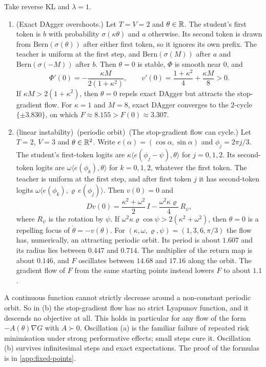 \begin{proposition}[Oscillations]\label{prop:oscillation}
Take reverse KL and $\lambda=1$.
\begin{enumerate}[label=(\alph*),nosep]
\item \Pv\Ck (Exact DAgger overshoots.) Let $T=V=2$ and $\theta\in\mathbb{R}$. The student's first token is $b$ with probability $\sigma(\kappa\theta)$
and $a$ otherwise. Its second token is drawn from $\mathrm{Bern}(\sigma(\theta))$ after either first token, so it ignores its own
prefix. The teacher is uniform at the first step, and $\mathrm{Bern}(\sigma(M))$ after $a$ and $\mathrm{Bern}(\sigma(-M))$ after $b$. Then $\theta=0$ is
stable, $\Phi$ is smooth near $0$, and
\[
\Phi'(0)=-\frac{\kappa M}{2(1+\kappa^2)},\qquad v'(0)=\frac{1+\kappa^2}4+\frac{\kappa M}8>0 .
\]
If $\kappa M>2(1+\kappa^2)$, then $\theta=0$ repels exact DAgger but attracts the stop-gradient flow. For $\kappa=1$ and $M=8$, exact
DAgger converges to the $2$-cycle $\{\pm3.830\}$, on which $F\approx8.155>F(0)\approx3.307$.
\item \Pv(linear instability)\ \Ck(periodic orbit)\ (The stop-gradient flow can cycle.) Let $T=2$, $V=3$ and $\theta\in\mathbb{R}^2$. Write
$e(\alpha)=(\cos\alpha,\sin\alpha)$ and $\phi_j=2\pi j/3$. The student's first-token logits are $\kappa\langle e(\phi_j-\psi),\theta\rangle$ for $j=0,1,2$. Its
second-token logits are $\omega\langle e(\phi_k),\theta\rangle$ for $k=0,1,2$, whatever the first token. The teacher is uniform at the first step,
and after first token $j$ it has second-token logits $\omega\langle e(\phi_k),\varrho\,e(\phi_j)\rangle$. Then $v(0)=0$ and
\[
Dv(0)=\frac{\kappa^2+\omega^2}2\,I-\frac{\omega^2\kappa\varrho}4\,R_\psi ,
\]
where $R_\psi$ is the rotation by $\psi$. If $\omega^2\kappa\varrho\cos\psi>2(\kappa^2+\omega^2)$, then $\theta=0$ is a repelling focus of $\dot\theta=-v(\theta)$. For
$(\kappa,\omega,\varrho,\psi)=(1,3,6,\pi/3)$ the flow has, numerically, an attracting periodic orbit. Its period is about $1.607$ and its radius
lies between $0.447$ and $0.714$. The multiplier of the return map is about $0.146$, and $F$ oscillates between $14.68$ and
$17.16$ along the orbit. The gradient flow of $F$ from the same starting points instead lowers $F$ to about $1.1$.
\end{enumerate}
\end{proposition}
\noindent
A continuous function cannot strictly decrease around a non-constant periodic orbit. So in (b) the stop-gradient
flow has no strict Lyapunov function, and it descends no objective at all. This holds in particular for any flow of the form $-A(\theta)\nabla G$
with $A\succ0$. Oscillation (a) is the familiar failure of repeated risk minimisation under strong performative
effects; small steps cure it. Oscillation (b) survives infinitesimal steps and exact expectations. The proof of
the formulas is in \cref{app:fixed-points}.

